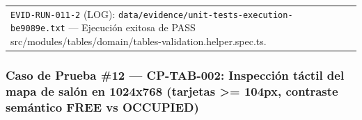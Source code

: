 \documentclass[10pt,a4paper]{article}
\begin{document}
{\begin{longtable}[]{@{}
  >{\raggedright\arraybackslash}p{}
  >{\raggedright\arraybackslash}p{}@{}}
\begin{minipage}[t]{\linewidth}
\texttt{EVID-{}\allowbreak{}RUN-{}\allowbreak{}011-{}\allowbreak{}2} (LOG): \texttt{data/\allowbreak{}evidence/\allowbreak{}unit-{}\allowbreak{}tests-{}\allowbreak{}execution-{}\allowbreak{}be9089e.\allowbreak{}txt} --- Ejecución exitosa de PASS src/modules/tables/domain/tables-validation.helper.spec.ts.\strut
\end{minipage} \\
\end{longtable}
}

\endgroup\medskip


\subsubsection{Caso de Prueba \#12 --- CP-TAB-002: Inspección táctil del mapa de salón en 1024x768 (tarjetas \textgreater= 104px, contraste semántico FREE vs OCCUPIED)}\label{caso-de-prueba-12--cp-tab-002-inspecciuxf3n-tuxe1ctil-del-mapa-de-saluxf3n-en-1024x768-tarjetas--104px-contraste-semuxe1ntico-free-vs-occupied}

\begingroup\singlespacing\footnotesize\setlength{\parskip}{0pt}
\end{document}

